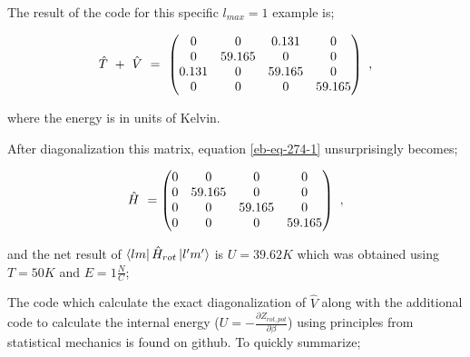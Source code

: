 \documentclass{article}
\begin{document}
The result of the code for this specific \begin{math} l_{max} = 1 \end{math} example is;

\begin{equation} \label{eb-eq-274-1}
\hat{T} \hspace{0.125cm}  + \hspace{0.125cm} \hat{V} \hspace{0.125cm} = \hspace{0.125cm} \begin{pmatrix} 0 & 0 & 0.131 & 0 \\ 0 & 59.165 & 0 & 0 \\ 0.131 & 0 & 59.165 & 0 \\ 0 & 0 & 0 & 59.165 \end{pmatrix} \hspace{0.125cm} ,
\end{equation} 

where the energy is in units of Kelvin.

After diagonalization this matrix, equation \ref{eb-eq-274-1} unsurprisingly becomes;

\begin{equation} \label{eb-eq-275-1}
\hat{H} \hspace{0.125cm} = \begin{pmatrix} 0 & 0 & 0 & 0 \\ 0 & 59.165 & 0 & 0 \\ 0 & 0 & 59.165 & 0 \\ 0 & 0 & 0 & 59.165 \end{pmatrix} \hspace{0.125cm} ,
\end{equation} 

and the net result of \begin{math} \bra{l m}\hat{H}_{rot}\ket{l' m'} \end{math} is \begin{math} U = 39.62 K \end{math} which was obtained using \begin{math} T = 50 K \end{math} and \begin{math} E = 1 \frac{N}{C} \end{math};

The code which calculate the exact diagonalization of \begin{math} \hat{V} \end{math} along with the additional code to calculate the internal energy (\begin{math} U  = -\frac{\partial{Z_{rot,pot}}}{\partial{\beta}} \end{math})  using principles from statistical mechanics is found on
github. To quickly summarize; 
\end{document}
